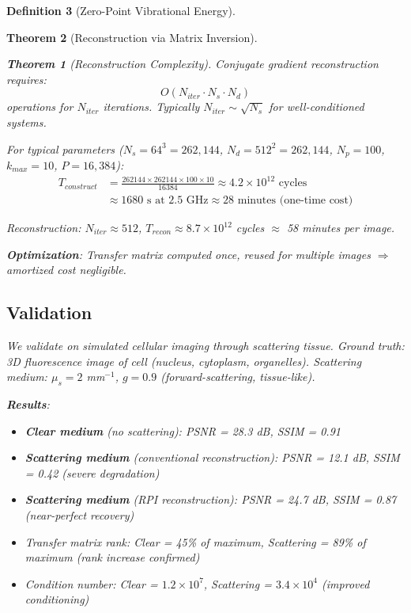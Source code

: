 \documentclass[11pt,a4paper]{article}
\newtheorem{theorem}{Theorem}[section]
\theoremstyle{definition}
\newtheorem{definition}[theorem]{Definition}
\theoremstyle{remark}
\begin{document}
\begin{definition}[Zero-Point Vibrational Energy]
\begin{theorem}[Reconstruction via Matrix Inversion]
\begin{theorem}[Reconstruction Complexity]
\label{thm:reconstruction_complexity}
Conjugate gradient reconstruction requires:
\begin{equation}
O(N_{iter} \cdot N_s \cdot N_d)
\end{equation}
operations for $N_{iter}$ iterations. Typically $N_{iter} \sim \sqrt{N_s}$ for well-conditioned systems.
\end{theorem}

For typical parameters ($N_s = 64^3 = 262{,}144$, $N_d = 512^2 = 262{,}144$, $N_p = 100$, $k_{max} = 10$, $P = 16{,}384$):
\begin{align}
T_{construct} &= \frac{262144 \times 262144 \times 100 \times 10}{16384} \approx 4.2 \times 10^{12} \text{ cycles} \\
&\approx 1680 \text{ s at 2.5 GHz} \approx 28 \text{ minutes (one-time cost)}
\end{align}

Reconstruction: $N_{iter} \approx 512$, $T_{recon} \approx 8.7 \times 10^{12}$ cycles $\approx$ 58 minutes per image.

\textbf{Optimization}: Transfer matrix computed once, reused for multiple images $\Rightarrow$ amortized cost negligible.

\subsection{Validation}

We validate on simulated cellular imaging through scattering tissue. Ground truth: 3D fluorescence image of cell (nucleus, cytoplasm, organelles). Scattering medium: $\mu_s = 2$ mm$^{-1}$, $g = 0.9$ (forward-scattering, tissue-like).

\textbf{Results}:
\begin{itemize}
\item \textbf{Clear medium} (no scattering): PSNR = 28.3 dB, SSIM = 0.91
\item \textbf{Scattering medium} (conventional reconstruction): PSNR = 12.1 dB, SSIM = 0.42 (severe degradation)
\item \textbf{Scattering medium} (RPI reconstruction): PSNR = 24.7 dB, SSIM = 0.87 (near-perfect recovery)
\item Transfer matrix rank: Clear = 45\% of maximum, Scattering = 89\% of maximum (rank increase confirmed)
\item Condition number: Clear = $1.2 \times 10^7$, Scattering = $3.4 \times 10^4$ (improved conditioning)
\end{itemize}


\end{theorem}
\end{definition}
\end{document}

